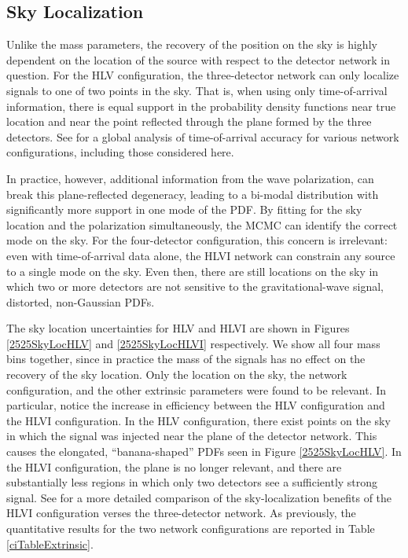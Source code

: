 \documentclass[11pt,a4paper]{emulateapj}
\begin{document}
\subsection{Sky Localization}
\label{skySection}
 
Unlike the mass parameters, the recovery of the position on the sky is highly dependent 
on the location of the source with respect to the detector network in question. 
For the HLV configuration, the three-detector network can only localize signals to one of
two points in the sky.  That is, when using only time-of-arrival information, there is 
equal support in the probability density functions near true location and near the 
point reflected through the plane formed by the three detectors.  See  \cite{Fairhurst2011} for
 a global analysis of time-of-arrival accuracy for various network configurations, including those considered
 here.  
  
  
  In practice, however, additional information from the wave polarization, can break this plane-reflected degeneracy,
   leading to a bi-modal distribution with significantly more support in one mode of the PDF.
     By fitting for the sky location and the polarization simultaneously, the MCMC can identify
   the correct mode on the sky.  For the four-detector configuration, this concern is irrelevant: even with time-of-arrival
   data alone, the HLVI network can constrain any source to a single mode on the sky.  Even then, there are still locations 
   on the sky in which two or more detectors are not sensitive to the gravitational-wave signal, distorted, non-Gaussian PDFs.  

The sky location uncertainties for HLV and HLVI are shown in Figures \ref{2525SkyLocHLV}
 and \ref{2525SkyLocHLVI} respectively.  We show all four mass bins together, since in practice
  the mass of the signals has no effect on the recovery of the sky location.  Only the location on 
  the sky, the network configuration, and the other extrinsic parameters were found to be relevant.  
  In particular, notice the increase in efficiency between the HLV configuration and the HLVI 
  configuration.  In the HLV configuration, there exist points on the sky in which the signal was injected
  near the plane of the detector network.  This causes the elongated, ``banana-shaped'' PDFs seen in
  Figure \ref{2525SkyLocHLV}.  In the HLVI configuration, the plane is no longer relevant, and there are substantially
  less regions in which only two detectors see a sufficiently strong signal.  
  See \cite{Veitch2012} for a more detailed comparison of the sky-localization benefits of the HLVI 
  configuration verses the three-detector network.  As previously, the quantitative results for the two network configurations
  are reported in Table \ref{ciTableExtrinsic}.
\end{document}
